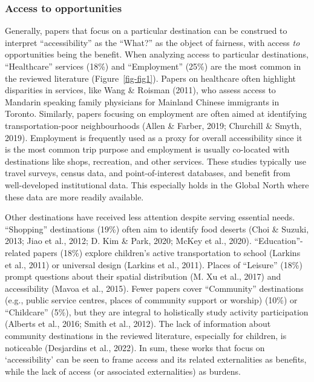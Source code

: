 \documentclass[
  letterpaper,
  DIV=11,
  numbers=noendperiod]{scrartcl}
\begin{document}
\subsubsection{Access to opportunities}\label{access-to-opportunities}

Generally, papers that focus on a particular destination can be
construed to interpret ``accessibility'' as the ``What?'' as the object
of fairness, with access \emph{to} opportunities being the benefit. When
analyzing access to particular destinations, ``Healthcare'' services
(18\%) and ``Employment'' (25\%) are the most common in the reviewed
literature (Figure~\ref{fig-fig1}). Papers on healthcare often highlight
disparities in services, like Wang \& Roisman (2011), who assess access
to Mandarin speaking family physicians for Mainland Chinese immigrants
in Toronto. Similarly, papers focusing on employment are often aimed at
identifying transportation-poor neighbourhoods (Allen \& Farber, 2019;
Churchill \& Smyth, 2019). Employment is frequently used as a proxy for
overall accessibility since it is the most common trip purpose and
employment is usually co-located with destinations like shops,
recreation, and other services. These studies typically use travel
surveys, census data, and point-of-interest databases, and benefit from
well-developed institutional data. This especially holds in the Global
North where these data are more readily available.

Other destinations have received less attention despite serving
essential needs. ``Shopping'' destinations (19\%) often aim to identify
food deserts (Choi \& Suzuki, 2013; Jiao et al., 2012; D. Kim \& Park,
2020; McKey et al., 2020). ``Education''-related papers (18\%) explore
children's active transportation to school (Larkins et al., 2011) or
universal design (Larkins et al., 2011). Places of ``Leisure'' (18\%)
prompt questions about their spatial distribution (M. Xu et al., 2017)
and accessibility (Mavoa et al., 2015). Fewer papers cover ``Community''
destinations (e.g., public service centres, places of community support
or worship) (10\%) or ``Childcare'' (5\%), but they are integral to
holistically study activity participation (Alberts et al., 2016; Smith
et al., 2012). The lack of information about community destinations in
the reviewed literature, especially for children, is noticeable
(Desjardins et al., 2022). In sum, these works that focus on
`accessibility' can be seen to frame access and its related
externalities as benefits, while the lack of access (or associated
externalities) as burdens.
\end{document}
